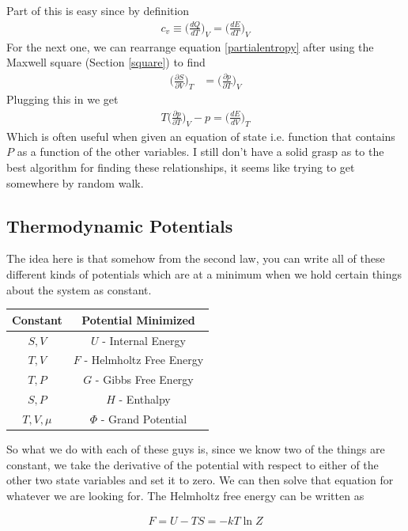 Part of this is easy since by definition
\begin{align}
c_v \equiv \Big(\frac{dQ}{dT}\Big)_V = \Big(\frac{dE}{dT}\Big)_V
\end{align}
For the next one, we can rearrange equation \ref{partialentropy} after using the Maxwell square (Section \ref{square}) to find
\begin{align}
\Big(\frac{\partial S}{\partial V}\Big)_T &= \Big(\frac{\partial p}{\partial T}\Big)_V
\end{align}
Plugging this in we get
\begin{align}
T\Big(\frac{\partial p}{\partial T}\Big)_V - p = \Big(\frac{dE}{dV}\Big)_T
\end{align}
Which is often useful when given an equation of state i.e. function that contains $P$ as a function of the other variables. I still don't have a solid grasp as to the best algorithm for finding these relationships, it seems like trying to get somewhere by random walk.



\subsection{Thermodynamic Potentials}
The idea here is that somehow from the second law, you can write all of these different kinds of potentials which are at a minimum when we 
hold certain things about the system as constant. \\

\begin{center}
\begin{tabular}{ c c }
Constant & Potential Minimized \\ \hline
$S,V$ & $U$ - Internal Energy\\
$T,V$ & $F$ - Helmholtz Free Energy\\  
$T,P$ & $G$ - Gibbs Free Energy \\
$S,P$ & $H$ - Enthalpy\\
$T,V,\mu$ & $\Phi$ - Grand Potential  
\end{tabular}
\end{center}
So what we do with each of these guys is, since we know two of the things are constant, we take the derivative of the potential with respect to either of the other two state variables and set it to zero. We can then solve that equation for whatever we are looking for. The Helmholtz free energy can be written as

\begin{align}
F = U - TS = -kT\ln Z
\end{align}



